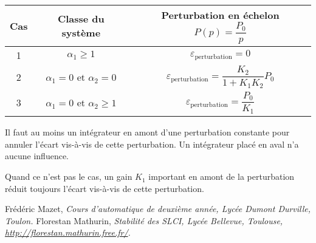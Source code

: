 \documentclass[10pt,fleqn]{article} %
\begin{document}

\begin{center}
\begin{tabular}{|c|c|c|}
\hline
Cas & Classe du système & Perturbation en échelon $P(p)=\dfrac{P_0}{p}$ \\ \hline
1 & $\alpha_1\geq 1$ & $\varepsilon_{\text{perturbation}}=0$ \\ \hline
2 & $\alpha_1=0$ et $\alpha_2=0$ & $\varepsilon_{\text{perturbation}}=\dfrac{K_2}{1+K_1K_2}P_0$ \\ \hline
3 & $\alpha_1=0$ et $\alpha_2\geq 1$ & $\varepsilon_{\text{perturbation}}=\dfrac{P_0}{K_1}$ \\ \hline
\end{tabular}
\end{center}

\begin{resultat}
Il faut au moins un intégrateur en amont d'une perturbation constante pour
annuler l'écart vis-à-vis de cette perturbation. Un intégrateur placé en aval n'a aucune
influence.

Quand ce n'est pas le cas, un gain $K_1$ important en amont de la perturbation réduit toujours
l'écart vis-à-vis de cette perturbation.
\end{resultat}




\begin{thebibliography}{2}
    Frédéric Mazet, {\it Cours d'automatique de deuxième année, Lycée Dumont Durville, Toulon.}
       Florestan Mathurin, {\it Stabilité des SLCI, Lycée Bellevue, Toulouse, \url{http://florestan.mathurin.free.fr/}.}



\end{thebibliography}
\end{document}
